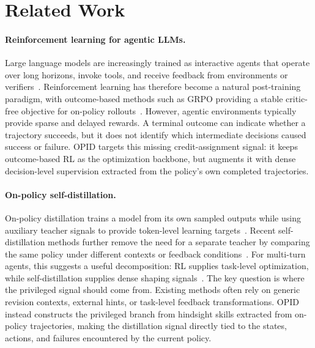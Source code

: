 \section{Related Work}\label{sec:related_work}
\paragraph{Reinforcement learning for agentic LLMs.}
Large language models are increasingly trained as interactive agents that operate over long horizons, invoke tools, and receive feedback from environments or verifiers~\citep{shridhar2020alfworld,yao2022webshop,jin2025searchr1,jimenez2023swebench,wu2026atlas}. Reinforcement learning has therefore become a natural post-training paradigm, with outcome-based methods such as GRPO providing a stable critic-free objective for on-policy rollouts~\citep{shao2024deepseekmath}. However, agentic environments typically provide sparse and delayed rewards. A terminal outcome can indicate whether a trajectory succeeds, but it does not identify which intermediate decisions caused success or failure. OPID targets this missing credit-assignment signal: it keeps outcome-based RL as the optimization backbone, but augments it with dense decision-level supervision extracted from the policy's own completed trajectories.

\paragraph{On-policy self-distillation.}
On-policy distillation trains a model from its own sampled outputs while using auxiliary teacher signals to provide token-level learning targets~\citep{agarwal2024onpolicy,gu2023minillm}. Recent self-distillation methods further remove the need for a separate teacher by comparing the same policy under different contexts or feedback conditions~\citep{zhao2026opsd,he2026sdzero}. For multi-turn agents, this suggests a useful decomposition: RL supplies task-level optimization, while self-distillation supplies dense shaping signals~\citep{lu2026sdar}. The key question is where the privileged signal should come from. Existing methods often rely on generic revision contexts, external hints, or task-level feedback transformations. OPID instead constructs the privileged branch from hindsight skills extracted from on-policy trajectories, making the distillation signal directly tied to the states, actions, and failures encountered by the current policy.

